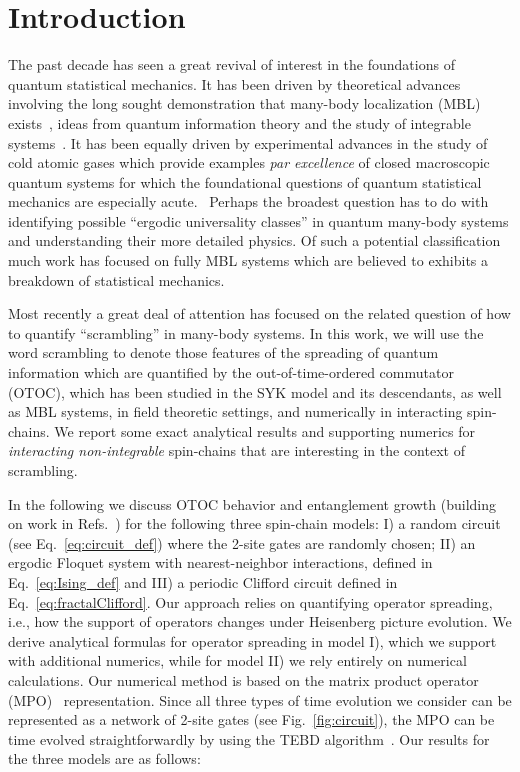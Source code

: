 \documentclass[aps,prb,twocolumn,superscriptaddress]{revtex4-1}
\begin{document}
\section{Introduction}\label{s:intro}
The past decade has seen a great revival of interest in the foundations of quantum statistical mechanics.
It has been driven by theoretical advances involving the long sought demonstration that many-body
localization (MBL)  exists~\cite{Basko06}, ideas from quantum information theory and the study of integrable systems~\cite{Essler16}. It has
been equally driven by experimental advances in the study of cold atomic gases which provide examples
{\it par excellence} of closed macroscopic quantum systems for which the foundational questions of
quantum statistical mechanics are especially acute.~\cite{Bloch2008}  Perhaps the broadest question has to do with 
identifying possible ``ergodic universality classes'' in quantum many-body systems and understanding
their more detailed physics. Of such a potential classification much work has focused on fully MBL systems
which are believed to exhibits a breakdown of statistical mechanics.~\cite{Nandkishore14}

Most recently a great deal of attention has focused on the related question of how to quantify ``scrambling'' in many-body systems\cite{Sekino08,Brown12,Lashkari2013,Shenker2014b,Hosur2016}. In this work, we will use the word scrambling to denote those features of the spreading of quantum information which are quantified by the out-of-time-ordered commutator (OTOC), which has been studied in the SYK model and its descendants\cite{Sachdev93,Kitaev15}, as well as MBL systems\cite{MBLOTOC1,MBLOTOC2,MBLOTOC3,MBLOTOC4,MBLOTOC5}, in field theoretic settings\cite{Stanford15,Stanford2016,Swingle17,Aleiner16,Dubail16}, and numerically in interacting spin-chains\cite{Moessner16,Bohrdt16,Prosen17,Cheryne}. We report some exact analytical results and supporting numerics for \textit{interacting non-integrable} spin-chains that are interesting in the context of scrambling.

In the following we discuss OTOC behavior and entanglement growth (building on work in Refs.~) for the following three spin-chain models: I) a random circuit (see Eq.~\eqref{eq:circuit_def}) where the 2-site gates are randomly chosen; II) an ergodic Floquet system with nearest-neighbor interactions, defined in Eq.~\eqref{eq:Ising_def} and III) a periodic Clifford circuit defined in Eq.~\eqref{eq:fractalClifford}. Our approach relies on quantifying operator spreading, i.e., how the support of operators changes under Heisenberg picture evolution. We derive analytical formulas for operator spreading in model I), which we support with additional numerics, while for model II) we rely entirely on numerical calculations. Our numerical method is based on the matrix product operator (MPO)~\cite{VerstraeteMPO} representation. Since all three types of time evolution we consider can be represented as a network of 2-site gates (see Fig.~\ref{fig:circuit}), the MPO can be time evolved straightforwardly by using the TEBD algorithm~\cite{VidalTEBD}. Our results for the three models are as follows:
\end{document}
